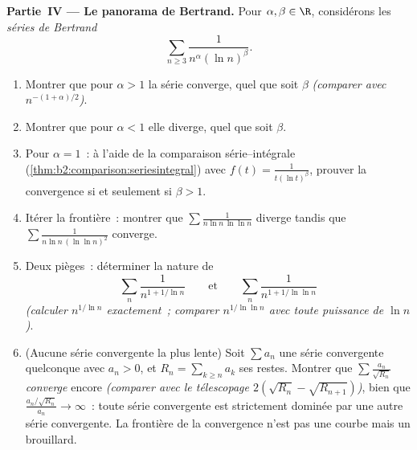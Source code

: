 \begin{problem}[{Problème du week-end --- $\zeta(2) = \pi^2/6$ et le
panorama de Bertrand}]
\medskip
\noindent\textbf{Partie~IV --- Le panorama de Bertrand.} Pour
$\alpha, \beta \in \R$, considérons les \emph{séries de Bertrand}
\[
\sum_{n \geq 3} \frac{1}{n^{\alpha}(\ln n)^{\beta}} .
\]
\begin{enumerate}[resume]
  \item Montrer que pour $\alpha > 1$ la série converge, quel que
        soit $\beta$ \emph{(comparer avec $n^{-(1+\alpha)/2}$)}.
  \item Montrer que pour $\alpha < 1$ elle diverge, quel que soit
        $\beta$.
  \item Pour $\alpha = 1$~: à l'aide de la comparaison série--intégrale
        (\cref{thm:b2:comparison:seriesintegral}) avec $f(t) =
        \frac{1}{t(\ln t)^\beta}$, prouver la convergence si et
        seulement si $\beta > 1$.
  \item Itérer la frontière~: montrer que $\sum\frac{1}{n\ln n\,\ln\ln
        n}$ diverge tandis que $\sum\frac{1}{n\ln n\,(\ln\ln n)^2}$
        converge.
  \item Deux pièges~: déterminer la nature de
        \[
        \sum_n \frac{1}{n^{1 + 1/\ln n}}
        \qquad\text{et}\qquad
        \sum_n \frac{1}{n^{1 + 1/\ln\ln n}}
        \]
        \emph{(calculer $n^{1/\ln n}$ exactement~; comparer
        $n^{1/\ln\ln n}$ avec toute puissance de $\ln n$)}.
  \item (Aucune série convergente la plus lente) Soit $\sum a_n$ une
        série convergente quelconque avec $a_n > 0$, et $R_n =
        \sum_{k \geq n}a_k$ ses restes. Montrer que $\sum
        \frac{a_n}{\sqrt{R_n}}$ \emph{converge} encore
        \emph{(comparer avec le télescopage $2(\sqrt{R_n} -
        \sqrt{R_{n+1}})$)}, bien que $\frac{a_n/\sqrt{R_n}}{a_n}
        \to \infty$~: toute série convergente est strictement
        dominée par une autre série convergente. La frontière de la
        convergence n'est pas une courbe mais un brouillard.
\end{enumerate}


\end{problem}
